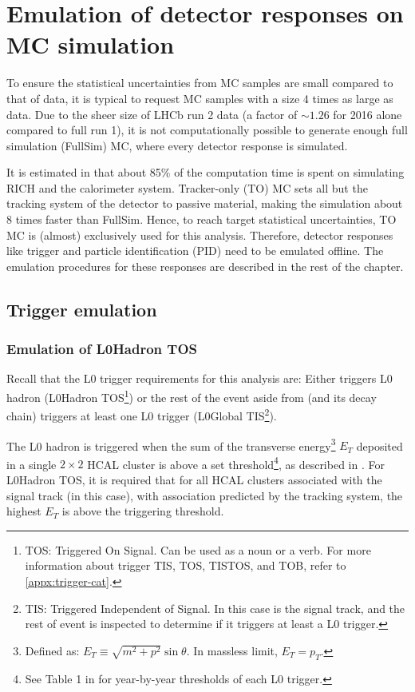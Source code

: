 \chapter{Emulation of detector responses on MC simulation}
\label{ref:mc-emulation}

To ensure the statistical uncertainties from MC samples are small compared to
that of data, it is typical to request MC samples with a size 4 times as large
as data.
Due to the sheer size of LHCb run 2 data (a factor of $\sim\!1.26$ for 2016
alone compared to full run 1), it is not computationally possible to generate
enough full simulation (FullSim) MC, where every detector response is simulated.

It is estimated in \cite{LHCb-INT-2019-025}
that about 85\% of the computation time is spent on simulating RICH and the
calorimeter system.
Tracker-only (TO) MC sets all but the tracking system of the detector to
passive material, making the simulation about 8 times faster than FullSim.
Hence, to reach target statistical uncertainties,
TO MC is (almost) exclusively used for this analysis.
Therefore, detector responses like trigger and particle identification (PID)
need to be emulated offline.
The emulation procedures for these responses are described in the rest of the
chapter.


\section{Trigger emulation}
\subsection{Emulation of L0Hadron TOS}

Recall that the L0 trigger requirements for this analysis are: Either \Dz
triggers L0 hadron (\Dz L0Hadron TOS\footnote{
    TOS: Triggered On Signal. Can be used as a noun or a verb.
    For more information about trigger TIS, TOS, TISTOS, and TOB, refer to
    \cref{appx:trigger-cat}.
}) or
the rest of the event aside from \B (and its decay chain) triggers at least
one L0 trigger
(\B L0Global TIS\footnote{
    TIS: Triggered Independent of Signal.
    In this case \B is the signal track, and the rest of event is inspected to
    determine if it triggers at least a L0 trigger.
}).

The L0 hadron is triggered when the sum of the transverse energy\footnote{
    Defined as: $E_T \equiv \sqrt{m^2 + p^2} \sin\theta$.
    In massless limit, $E_T = p_T$.
} $E_T$ deposited
in a single $2 \times 2$ HCAL cluster is above a set threshold\footnote{
    See Table 1 in \cite{LHCb-DP-2019-001} for year-by-year thresholds of each
    L0 trigger.
}, as described in \cite{LHCb-DP-2019-001}.
For L0Hadron TOS, it is required that for all HCAL clusters associated with the
signal track (\Dz in this case), with association predicted by the tracking
system,
the highest $E_T$ is above the triggering threshold.

